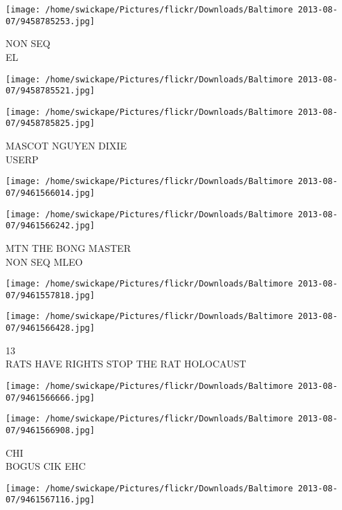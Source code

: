 \documentclass[10pt,letterpaper]{article}
\begin{document}
\vspace{0.25in}
\texttt{[image: /home/swickape/Pictures/flickr/Downloads/Baltimore 2013-08-07/9458785253.jpg]}

NON SEQ\\
EL\\
\pagebreak

\texttt{[image: /home/swickape/Pictures/flickr/Downloads/Baltimore 2013-08-07/9458785521.jpg]}

\vspace{0.25in}
\texttt{[image: /home/swickape/Pictures/flickr/Downloads/Baltimore 2013-08-07/9458785825.jpg]}

MASCOT NGUYEN DIXIE\\
USERP\\
\pagebreak

\texttt{[image: /home/swickape/Pictures/flickr/Downloads/Baltimore 2013-08-07/9461566014.jpg]}

\vspace{0.25in}
\texttt{[image: /home/swickape/Pictures/flickr/Downloads/Baltimore 2013-08-07/9461566242.jpg]}

MTN THE BONG MASTER\\
NON SEQ MLEO\\
\pagebreak

\texttt{[image: /home/swickape/Pictures/flickr/Downloads/Baltimore 2013-08-07/9461557818.jpg]}

\vspace{0.25in}
\texttt{[image: /home/swickape/Pictures/flickr/Downloads/Baltimore 2013-08-07/9461566428.jpg]}

13\\
RATS HAVE RIGHTS STOP THE RAT HOLOCAUST\\
\pagebreak

\texttt{[image: /home/swickape/Pictures/flickr/Downloads/Baltimore 2013-08-07/9461566666.jpg]}

\vspace{0.25in}
\texttt{[image: /home/swickape/Pictures/flickr/Downloads/Baltimore 2013-08-07/9461566908.jpg]}

CHI\\
BOGUS CIK EHC\\
\pagebreak

\texttt{[image: /home/swickape/Pictures/flickr/Downloads/Baltimore 2013-08-07/9461567116.jpg]}
\end{document}
